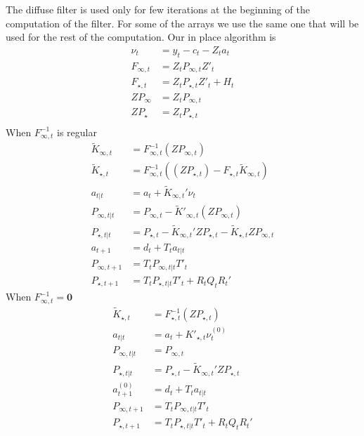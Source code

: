 \documentclass{article}
\begin{document}
The diffuse filter is used only for few iterations at the beginning of
the computation of the filter. For some of the arrays we use the same
one that will be used for the rest of the computation. Our in place
algorithm is
\begin{align*}
  \nu_t &= y_t - c_t - Z_t a_t \\
  F_{\infty,t} &= Z_tP_{\infty,t}Z'_t \\
  F_{\star,t} &= Z_tP_{\star,t}Z'_t + H_t \\
  ZP_\infty &= Z_tP_{\infty,t}\\
  ZP_\star &= Z_tP_{\star,t} \\
\end{align*}
When $F^{-1}_{\infty,t}$ is regular
\begin{align*}
  \tilde K_{\infty,t} &= F^{-1}_{\infty,t}(ZP_{\infty,t}) \\
  \tilde K_{\star,t} &=  F^{-1}_{\infty,t}((ZP_{\star,t}) -
                       F_{\star,t}\tilde K_{\infty,t}) \\
  a_{t|t} &= a_t + \tilde K_{\infty,t}'\nu_t\\
  P_{\infty,t|t} &= P_{\infty,t} - \tilde K'_{\infty,t}(ZP_{\infty,t}) \\
  P_{\star,t|t} &= P_{\star,t} - \tilde K_{\infty,t}'ZP_{\star,t}
                  - \tilde K_{\star,t}ZP_{\infty,t}\\
  a_{t+1} &= d_t + T_ta_{t|t} \\
  P_{\infty,t+ 1} &= T_tP_{\infty,t|t}T'_t\\
  P_{\star, t+1} &= T_tP_{\star,t|t}T'_t + R_tQ_tR_t'
\end{align*}
When $F^{-1}_{\infty,t} = \mathbf{0}$
\begin{align*}
  \tilde K_{\star,t} &= F^{-1}_{\star,t}(ZP_{\star,t})\\
  a_{t|t} &= a_t + K'_{\star,t}\nu^{(0)}_t\\
  P_{\infty,t|t} &= P_{\infty,t} \\
  P_{\star,t|t} &= P_{\star,t} - \tilde K_{\infty,t}'ZP_{\star,t}\\
  a^{(0)}_{t+1} &= d_t + T_ta_{t|t}\\
  P_{\infty,t+ 1} &= T_tP_{\infty,t|t}T'_t \\
  P_{\star, t+1} &= T_tP_{\star,t|t}T'_t + R_tQ_tR_t' 
\end{align*}
\end{document}
